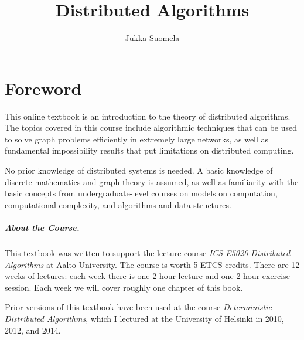 
\newcommand{\definepage}[1]{\stepcounter{myexternalpagenum}\edef#1{\arabic{myexternalpagenum}}}




\title{Distributed Algorithms}
\author{Jukka Suomela}




\frontmatter
\maketitle
\tableofcontents

\chapter*{Foreword}

This online textbook is an introduction to the theory of distributed algorithms. The topics covered in this course include algorithmic techniques that can be used to solve graph problems efficiently in extremely large networks, as well as fundamental impossibility results that put limitations on distributed computing.

No prior knowledge of distributed systems is needed. A basic knowledge of discrete mathematics and graph theory is assumed, as well as familiarity with the basic concepts from undergraduate-level courses on models on computation, computational complexity, and algorithms and data structures.

\paragraph{About the Course.}

This textbook was written to support the lecture course \emph{ICS-E5020 Distributed Algorithms} at Aalto University. The course is worth 5 ETCS credits. There are 12 weeks of lectures: each week there is one 2-hour lecture and one 2-hour exercise session. Each week we will cover roughly one chapter of this book.

Prior versions of this textbook have been used at the course \emph{Deterministic Distributed Algorithms}, which I lectured at the University of Helsinki in 2010, 2012, and 2014.

